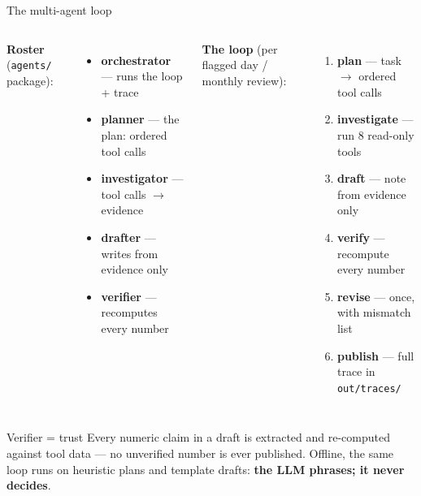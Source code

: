 \documentclass[aspectratio=169]{beamer}
\begin{document}
\begin{frame}{The multi-agent loop}
  \begin{columns}[T]
    \textbf{Roster} (\texttt{agents/} package):
    \begin{itemize}
      \item \textbf{orchestrator} --- runs the loop + trace
      \item \textbf{planner} --- the plan: ordered tool calls
      \item \textbf{investigator} --- tool calls $\rightarrow$ evidence
      \item \textbf{drafter} --- writes from evidence only
      \item \textbf{verifier} --- recomputes every number
    \end{itemize}
    \textbf{The loop} (per flagged day / monthly review):
    \begin{enumerate}
      \item \textbf{plan} --- task $\rightarrow$ ordered tool calls
      \item \textbf{investigate} --- run 8 read-only tools
      \item \textbf{draft} --- note from evidence only
      \item \textbf{verify} --- recompute every number
      \item \textbf{revise} --- once, with mismatch list
      \item \textbf{publish} --- full trace in \texttt{out/traces/}
    \end{enumerate}
  \end{columns}
  \begin{block}{Verifier = trust}
    \small Every numeric claim in a draft is extracted and re-computed against
    tool data --- no unverified number is ever published. Offline, the same
    loop runs on heuristic plans and template drafts: \textbf{the LLM phrases;
    it never decides}.
  \end{block}
\end{frame}
\end{document}
